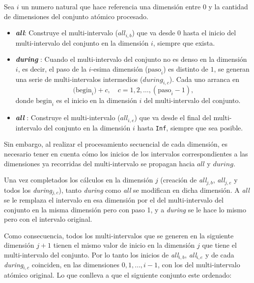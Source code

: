 Sea $i$ un numero natural que hace referencia una dimensión entre $0$ y la cantidad de dimensiones del conjunto atómico procesado.
\begin{itemize}
  \item \textbf{\textit{all}}:  
    Construye el multi-intervalo ($\textit{all}_{i,b}$) que va desde $0$ hasta el inicio del multi-intervalo del conjunto en la dimensión $i$, siempre que exista.

  \item \textbf{\textit{during}} :  
    Cuando el multi-intervalo del conjunto no es denso en la dimensión $i$, es decir, el paso de la $i$-esima dimensión ($\text{paso}_i$) es distinto de $1$, se generan una serie de multi-intervalos intermedios ($\textit{during}_{i,c}$). Cada uno arranca en
    \[
      \bigl(\text{begin}_i\bigr) + c,
      \quad c = 1, 2, \dots, (\text{paso}_i - 1),
    \]
    donde $\text{begin}_i$ es el inicio en la dimensión $i$ del multi-intervalo del conjunto.

  \item \textbf{\textit{all}} :  
    Construye el multi-intervalo ($\textit{all}_{i,e}$) que va desde el final del multi-intervalo del conjunto en la dimensión $i$ hasta \texttt{Inf}, siempre que sea posible.
\end{itemize}

Sin embargo, al realizar el procesamiento secuencial de cada dimensión, es necesario tener en cuenta cómo los inicios de los intervalos correspondientes a las dimensiones ya recorridas del multi-intervalo  se propagan hacia $all$ y $during$. 

Una vez completados los cálculos en la dimensión $j$ (creación de \textit{all}$_{j,b}$, \textit{all}$_{j,e}$ y todos los \textit{during}$_{j,c}$), tanto \textit{during} como \textit{all} se modifican en dicha dimensión. A \textit{all} se le remplaza el intervalo en esa dimensión por el del multi-intervalo del conjunto en la misma dimensión pero con paso 1, y a \textit{during} se le hace lo mismo pero con el intervalo original.

Como consecuencia, todos los multi-intervalos que se generen en la siguiente dimensión $j+1$ tienen el mismo valor de inicio en la dimensión $j$ que tiene el multi-intervalo del conjunto. Por lo tanto los inicios de \textit{all}$_{i,b}$, \textit{all}$_{i,e}$ y de cada \textit{during}$_{i,c}$ coinciden, en las dimensiones $0,1,\ldots,i-1$, con los del multi-intervalo atómico original. Lo que conlleva a que el siguiente conjunto este ordenado:

